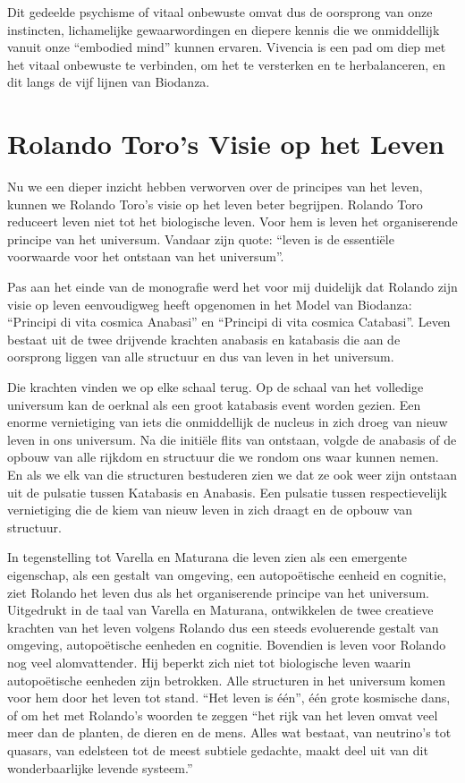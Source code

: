 \documentclass[
  11pt,
]{book}
\begin{document}
Dit gedeelde psychisme of vitaal onbewuste omvat dus de oorsprong van onze instincten, lichamelijke gewaarwordingen en diepere kennis die we onmiddellijk vanuit onze ``embodied mind'' kunnen ervaren. Vivencia is een pad om diep met het vitaal onbewuste te verbinden, om het te versterken en te herbalanceren, en dit langs de vijf lijnen van Biodanza.

\hypertarget{rolando-toros-visie-op-het-leven}{%
\section{Rolando Toro's Visie op het Leven}\label{rolando-toros-visie-op-het-leven}}

Nu we een dieper inzicht hebben verworven over de principes van het leven, kunnen we Rolando Toro's visie op het leven beter begrijpen.
Rolando Toro reduceert leven niet tot het biologische leven.
Voor hem is leven het organiserende principe van het universum.
Vandaar zijn quote: ``leven is de essentiële voorwaarde voor het ontstaan van het universum''.

Pas aan het einde van de monografie werd het voor mij duidelijk dat Rolando zijn visie op leven eenvoudigweg heeft opgenomen in het Model van Biodanza: ``Principi di vita cosmica Anabasi'' en ``Principi di vita cosmica Catabasi''.
Leven bestaat uit de twee drijvende krachten anabasis en katabasis die aan de oorsprong liggen van alle structuur en dus van leven in het universum.

Die krachten vinden we op elke schaal terug.
Op de schaal van het volledige universum kan de oerknal als een groot katabasis event worden gezien. Een enorme vernietiging van iets die onmiddellijk de nucleus in zich droeg van nieuw leven in ons universum. Na die initiële flits van ontstaan, volgde de anabasis of de opbouw van alle rijkdom en structuur die we rondom ons waar kunnen nemen.\\
En als we elk van die structuren bestuderen zien we dat ze ook weer zijn ontstaan uit de pulsatie tussen Katabasis en Anabasis. Een pulsatie tussen respectievelijk vernietiging die de kiem van nieuw leven in zich draagt en de opbouw van structuur.

In tegenstelling tot Varella en Maturana die leven zien als een emergente eigenschap, als een gestalt van omgeving, een autopoëtische eenheid en cognitie, ziet Rolando het leven dus als het organiserende principe van het universum. Uitgedrukt in de taal van Varella en Maturana, ontwikkelen de twee creatieve krachten van het leven volgens Rolando dus een steeds evoluerende gestalt van omgeving, autopoëtische eenheden en cognitie.
Bovendien is leven voor Rolando nog veel alomvattender. Hij beperkt zich niet tot biologische leven waarin autopoëtische eenheden zijn betrokken. Alle structuren in het universum komen voor hem door het leven tot stand. ``Het leven is één'', één grote kosmische dans, of om het met Rolando's woorden te zeggen ``het rijk van het leven omvat veel meer dan de planten, de dieren en de mens. Alles wat bestaat, van neutrino's tot quasars, van edelsteen tot de meest subtiele gedachte, maakt deel uit van dit wonderbaarlijke levende systeem.''
\end{document}
